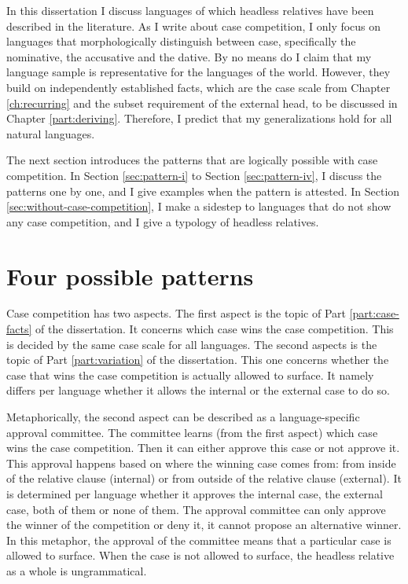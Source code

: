 In this dissertation I discuss languages of which headless relatives have been described in the literature. As I write about case competition, I only focus on languages that morphologically distinguish between case, specifically the nominative, the accusative and the dative. By no means do I claim that my language sample is representative for the languages of the world. However, they build on independently established facts, which are the case scale from Chapter \ref{ch:recurring} and the subset requirement of the external head, to be discussed in Chapter \ref{part:deriving}. Therefore, I predict that my generalizations hold for all natural languages.

The next section introduces the patterns that are logically possible with case competition. In Section \ref{sec:pattern-i} to Section \ref{sec:pattern-iv}, I discuss the patterns one by one, and I give examples when the pattern is attested. In Section \ref{sec:without-case-competition}, I make a sidestep to languages that do not show any case competition, and I give a typology of headless relatives.


\section{Four possible patterns}\label{sec:possible-patterns}

Case competition has two aspects. The first aspect is the topic of Part \ref{part:case-facts} of the dissertation. It concerns which case wins the case competition. This is decided by the same case scale for all languages. The second aspects is the topic of Part \ref{part:variation} of the dissertation. This one concerns whether the case that wins the case competition is actually allowed to surface. It namely differs per language whether it allows the internal or the external case to do so.

Metaphorically, the second aspect can be described as a language-specific approval committee. The committee learns (from the first aspect) which case wins the case competition. Then it can either approve this case or not approve it. This approval happens based on where the winning case comes from: from inside of the relative clause (internal) or from outside of the relative clause (external). It is determined per language whether it approves the internal case, the external case, both of them or none of them. The approval committee can only approve the winner of the competition or deny it, it cannot propose an alternative winner. In this metaphor, the approval of the committee means that a particular case is allowed to surface. When the case is not allowed to surface, the headless relative as a whole is ungrammatical.

